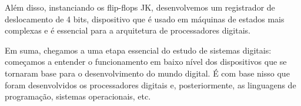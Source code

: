 \documentclass[a4paper,12pt]{article}
\begin{document}
Além disso, instanciando os flip-flops JK, desenvolvemos um registrador de deslocamento de 4 bits, dispositivo que é usado em máquinas de estados mais complexas e é essencial para a arquitetura de processadores digitais.

Em suma, chegamos a uma etapa essencial do estudo de sistemas digitais: começamos a entender o funcionamento em baixo nível dos dispositivos que se tornaram base para o desenvolvimento do mundo digital. É com base nisso que foram desenvolvidos os processadores digitais e, posteriormente, as linguagens de programação, sistemas operacionais, etc.
\end{document}
